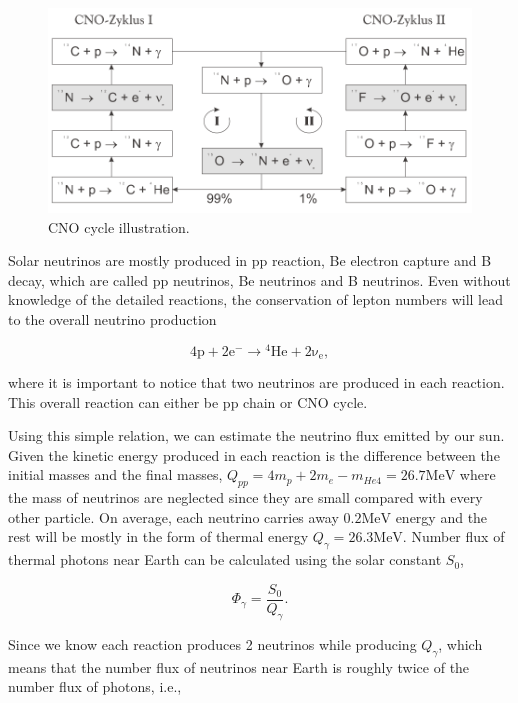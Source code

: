 \documentclass[%
 aip,
 jmp,%
 amsmath,amssymb,
 reprint,%
]{revtex4-1}
\begin{document}
\begin{figure}[!hbtp]
\centering
\includegraphics[width=\columnwidth]{assets/cno_cycle.png}
\caption{CNO cycle illustration.\cite{Adelberger2011a}}
\label{fig:cno_cycle}
\end{figure}


Solar neutrinos are mostly produced in pp reaction, Be electron capture and B decay, which are called pp neutrinos, Be neutrinos and B neutrinos. Even without knowledge of the detailed reactions, the conservation of lepton numbers will lead to the overall neutrino production

\begin{equation}
\mathrm{4p+2e^- \to {}^4He + 2\nu_e },
\end{equation}

where it is important to notice that two neutrinos are produced in each reaction. This overall reaction can either be pp chain or CNO cycle.

Using this simple relation, we can estimate the neutrino flux emitted by our sun. Given the kinetic energy produced in each reaction is the difference between the initial masses and the final masses, $Q_{pp}=4m_p+2m_e-m_{He4}=26.7\mathrm{MeV}$ where the mass of neutrinos are neglected since they are small compared with every other particle. On average, each neutrino carries away $0.2\mathrm{MeV}$ energy and the rest will be mostly in the form of thermal energy $Q_\gamma=26.3\mathrm{MeV}$. Number flux of thermal photons near Earth can be calculated using the solar constant $S_0$,

\begin{equation}
\Phi_\gamma = \frac{S_0}{Q_\gamma}.
\end{equation}

Since we know each reaction produces 2 neutrinos while producing $Q_\gamma$, which means that the number flux of neutrinos near Earth is roughly twice of the number flux of photons, i.e.,
\end{document}
